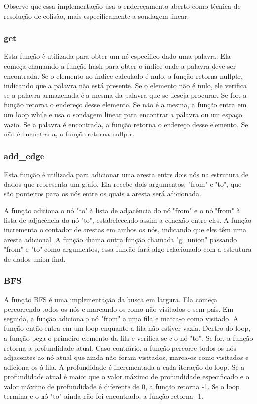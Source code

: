 \documentclass[a4paper,11pt]{article}
\begin{document}
Observe que essa implementação usa o endereçamento aberto como técnica de resolução de colisão, mais especificamente a sondagem linear.

    \subsubsection{get}
    Esta função é utilizada para obter um nó específico dado uma palavra. Ela começa chamando a função hash para obter o índice onde a palavra deve ser encontrada. Se o elemento no índice calculado é nulo, a função retorna nullptr, indicando que a palavra não está presente. Se o elemento não é nulo, ele verifica se a palavra armazenada é a mesma da palavra que se deseja procurar. Se for, a função retorna o endereço desse elemento. Se não é a mesma, a função entra em um loop while e usa o sondagem linear para encontrar a palavra ou um espaço vazio. Se a palavra é encontrada, a função retorna o endereço desse elemento. Se não é encontrada, a função retorna nullptr.

    \subsubsection{add\_edge}
    Esta função é utilizada para adicionar uma aresta entre dois nós na estrutura de dados que representa um grafo. Ela recebe dois argumentos, "from" e "to", que são ponteiros para os nós entre os quais a aresta será adicionada.

    A função adiciona o nó "to" à lista de adjacência do nó "from" e o nó "from" à lista de adjacência do nó "to", estabelecendo assim a conexão entre eles.
    A função incrementa o contador de arestas em ambos os nós, indicando que eles têm uma aresta adicional.
    A função chama outra função chamada "g\_union" passando "from" e "to" como argumentos, essa função fará algo relacionado com a estrutura de dados union-find.

    \subsubsection{BFS}
    A função BFS é uma implementação da busca em largura. Ela começa percorrendo todos os nós e marcando-os como não visitados e sem pais. Em seguida, a função adiciona o nó "from" a uma fila e marca-o como visitado. A função então entra em um loop enquanto a fila não estiver vazia. Dentro do loop, a função pega o primeiro elemento da fila e verifica se é o nó "to". Se for, a função retorna a profundidade atual. Caso contrário, a função percorre todos os nós adjacentes ao nó atual que ainda não foram visitados, marca-os como visitados e adiciona-os à fila. A profundidade é incrementada a cada iteração do loop. Se a profundidade atual é maior que o valor máximo de profundidade especificado e o valor máximo de profundidade é diferente de 0, a função retorna -1. Se o loop termina e o nó "to" ainda não foi encontrado, a função retorna -1.
\end{document}
